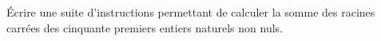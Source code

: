 \'Ecrire une suite d'instructions permettant de calculer la somme des racines carrées des cinquante premiers entiers naturels non nuls. 
